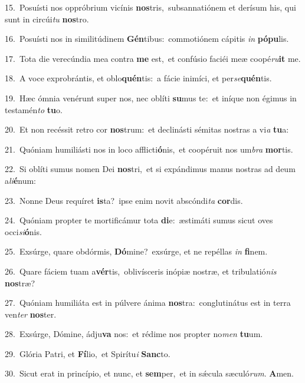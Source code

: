 {\numbfont\textcolor{\numbcolor}{15.}}~Posuísti nos oppróbrium vicínis \textbf{nos}\-tris,~\star subsannatiónem et derísum his, qui sunt in circúi\textit{tu} \textbf{nos}\-tro.\par
{\numbfont\textcolor{\numbcolor}{16.}}~Posuísti nos in similitúdinem \textbf{Gén}\-tibus:~\star commotiónem cápitis \textit{in} \textbf{pó}\-\textbf{pu}lis.\par
{\numbfont\textcolor{\numbcolor}{17.}}~Tota die verecúndia mea contra \textbf{me} est,~\star et confúsio faciéi meæ coopé\-\textit{ru}\-\textbf{it} me.\par
{\numbfont\textcolor{\numbcolor}{18.}}~A voce exprobrántis, et oblo\-\textbf{quén}\-tis:~\star a fácie inimíci, et per\-\textit{se}\-\textbf{quén}tis.\par
{\numbfont\textcolor{\numbcolor}{19.}}~Hæc ómnia venérunt super nos, nec oblíti \textbf{su}\-mus te:~\star et iníque non égimus in testamén\textit{to} \textbf{tu}\-o.\par
{\numbfont\textcolor{\numbcolor}{20.}}~Et non recéssit retro cor \textbf{nos}\-trum:~\star et declinásti sémitas nostras a vi\textit{a} \textbf{tu}\-a:\par
{\numbfont\textcolor{\numbcolor}{21.}}~Quóniam humiliásti nos in loco afflicti\-\textbf{ó}\-nis,~\star et coopéruit nos um\textit{bra} \textbf{mor}\-tis.\par
{\numbfont\textcolor{\numbcolor}{22.}}~Si oblíti sumus nomen Dei \textbf{nos}\-tri,~\star et si expándimus manus nostras ad deum a\-\textit{li}\-\textbf{é}num:\par
{\numbfont\textcolor{\numbcolor}{23.}}~Nonne Deus requíret \textbf{is}\-ta?~\star ipse enim novit abscóndi\textit{ta} \textbf{cor}\-dis.\par
{\numbfont\textcolor{\numbcolor}{24.}}~Quóniam propter te mortificámur tota \textbf{di}\-e:~\star æstimáti sumus sicut oves occi\-\textit{si}\-\textbf{ó}nis.\par
{\numbfont\textcolor{\numbcolor}{25.}}~Exsúrge, quare obdórmis, \textbf{Dó}\-mine?~\star exsúrge, et ne repéllas \textit{in} \textbf{fi}\-nem.\par
{\numbfont\textcolor{\numbcolor}{26.}}~Quare fáciem tuam a\-\textbf{vér}\-tis,~\star oblivísceris inópiæ nostræ, et tribulatió\textit{nis} \textbf{nos}\-træ?\par
{\numbfont\textcolor{\numbcolor}{27.}}~Quóniam humiliáta est in púlvere ánima \textbf{nos}\-tra:~\star conglutinátus est in terra ven\textit{ter} \textbf{nos}\-ter.\par
{\numbfont\textcolor{\numbcolor}{28.}}~Exsúrge, Dómine, ádju\textbf{va} nos:~\star et rédime nos propter no\textit{men} \textbf{tu}\-um.\par
{\numbfont\textcolor{\numbcolor}{29.}}~Glória Patri, et \textbf{Fí}\-lio,~\star et Spirítu\textit{i} \textbf{Sanc}\-to.\par
{\numbfont\textcolor{\numbcolor}{30.}}~Sicut erat in princípio, et nunc, et \textbf{sem}\-per,~\star et in sǽcula sæculó\-\textit{rum}\-. \textbf{A}\-men.\par
